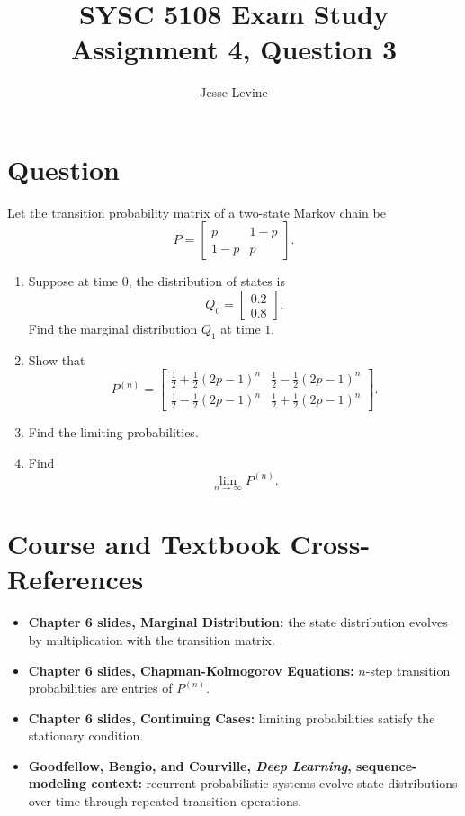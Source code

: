 \documentclass[11pt]{article}
\title{SYSC 5108 Exam Study\\Assignment 4, Question 3}
\author{Jesse Levine}
\date{}
\begin{document}
\maketitle

\section*{Question}

Let the transition probability matrix of a two-state Markov chain be
\[
    P =
    \begin{bmatrix}
        p & 1-p \\
        1-p & p
    \end{bmatrix}.
\]

\begin{enumerate}[label=(\alph*)]
    \item Suppose at time \(0\), the distribution of states is
    \[
        Q_0 = \begin{bmatrix}0.2\\0.8\end{bmatrix}.
    \]
    Find the marginal distribution \(Q_1\) at time \(1\).
    \item Show that
    \[
        P^{(n)}
        =
        \begin{bmatrix}
            \frac12+\frac12(2p-1)^n & \frac12-\frac12(2p-1)^n \\
            \frac12-\frac12(2p-1)^n & \frac12+\frac12(2p-1)^n
        \end{bmatrix}.
    \]
    \item Find the limiting probabilities.
    \item Find
    \[
        \lim_{n\to\infty} P^{(n)}.
    \]
\end{enumerate}

\section*{Course and Textbook Cross-References}

\begin{itemize}
    \item \textbf{Chapter 6 slides, Marginal Distribution:} the state distribution
    evolves by multiplication with the transition matrix.
    \item \textbf{Chapter 6 slides, Chapman-Kolmogorov Equations:} \(n\)-step
    transition probabilities are entries of \(P^{(n)}\).
    \item \textbf{Chapter 6 slides, Continuing Cases:} limiting probabilities
    satisfy the stationary condition.
    \item \textbf{Goodfellow, Bengio, and Courville, \emph{Deep Learning},
    sequence-modeling context:} recurrent probabilistic systems evolve state
    distributions over time through repeated transition operations.
\end{itemize}
\end{document}
